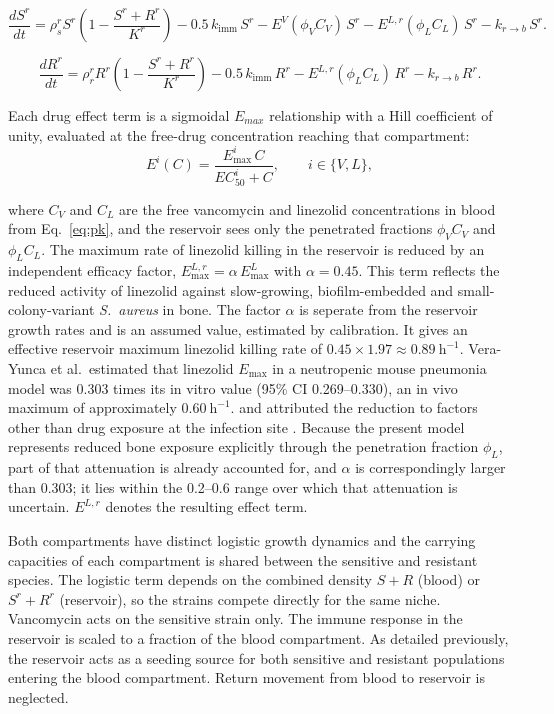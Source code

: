 \documentclass[12pt, draftcls, onecolumn]{IEEEtran}
\begin{document}
\begin{equation}
\frac{dS^r}{dt}
= \rho_{s}^{r} S^{r} \left( 1 - \frac{S^r + R^r}{K^r} \right)
- 0.5\, k_{\text{imm}}\, S^r
- E^{V}(\phi_{V} C_V)\, S^r
- E^{L,r}(\phi_{L} C_L)\, S^r
- k_{r\to b}\, S^r .
\label{eq:dSrdt}
\end{equation}


\begin{equation}
\frac{dR^r}{dt}
= \rho_{r}^{r} R^{r} \left( 1 - \frac{S^r + R^r}{K^r} \right)
- 0.5\, k_{\text{imm}}\, R^r
- E^{L,r}(\phi_{L} C_L)\, R^r
- k_{r\to b}\, R^r .
\label{eq:dRrdt}
\end{equation}



Each drug effect term is a sigmoidal $E_{max}$ relationship with a Hill
coefficient of unity, evaluated at the free-drug concentration reaching
that compartment:
\begin{equation}
E^{i}(C) = \frac{E_{\max}^{i}\, C}{EC_{50}^{i} + C},
\qquad i \in \{V, L\},
\label{eq:hill}
\end{equation}


where $C_V$ and $C_L$ are the free vancomycin and linezolid
concentrations in blood from Eq.~\eqref{eq:pk}, and the reservoir sees
only the penetrated fractions $\phi_V C_V$ and $\phi_L C_L$. The maximum rate of linezolid killing in the
reservoir is reduced by an independent efficacy factor,
$E_{\max}^{L,r} = \alpha\,E_{\max}^{L}$ with $\alpha = 0.45$.   This term reflects the
reduced activity of linezolid against slow-growing, biofilm-embedded and
small-colony-variant \textit{S.~aureus} in bone. The factor $\alpha$ is seperate
from the reservoir growth rates and is an assumed value, estimated by calibration.
It gives an effective reservoir maximum linezolid killing rate of
$0.45 \times 1.97 \approx 0.89~\mathrm{h}^{-1}$. Vera-Yunca et al.\ estimated that linezolid
$E_{\max}$ in a neutropenic mouse pneumonia model was 0.303 times its in vitro value (95\% CI
0.269--0.330), an in vivo maximum of approximately $0.60~\mathrm{h}^{-1}$.   and attributed the
reduction to factors other than drug exposure at the infection site \cite{VeraYunca2025}.
Because the present model represents reduced bone exposure explicitly through the penetration
fraction $\phi_L$, part of that attenuation is already accounted for, and $\alpha$ is
correspondingly larger than 0.303; it lies within the 0.2--0.6 range over which that
attenuation is uncertain.
$E^{L,r}$ denotes the resulting effect term.

Both compartments have distinct logistic growth dynamics and the carrying
capacities of each compartment is shared between the sensitive and resistant species.
The logistic term depends on the combined density $S+R$ (blood) or $S^r+R^r$ (reservoir), so the strains compete directly for the same niche.
Vancomycin acts on the sensitive strain only.
The immune response in the reservoir is scaled to a fraction of the
blood compartment. As detailed previously, the reservoir acts as a seeding
source for both sensitive and resistant populations entering the blood
compartment. Return movement from blood to reservoir is neglected.
\end{document}
